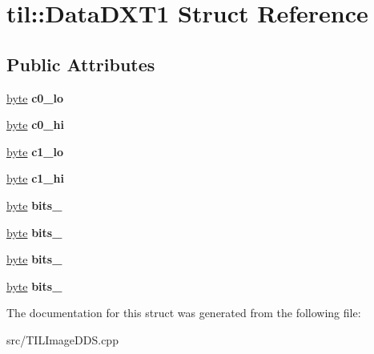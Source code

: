 \hypertarget{structtil_1_1_data_d_x_t1}{
\section{til::DataDXT1 Struct Reference}
\label{structtil_1_1_data_d_x_t1}
}
\subsection*{Public Attributes}
\begin{DoxyCompactItemize}
\item 
\hypertarget{structtil_1_1_data_d_x_t1_a2ffc72e66293f9b049a7bb83b9b325bd}{
\hyperlink{namespacetil_a5f3ec10aca1a788b495a0bd3787bc2dc}{byte} {\bfseries c0\_\-lo}}
\label{structtil_1_1_data_d_x_t1_a2ffc72e66293f9b049a7bb83b9b325bd}

\item 
\hypertarget{structtil_1_1_data_d_x_t1_a32e9d420a013bd7413807927ed8cb58c}{
\hyperlink{namespacetil_a5f3ec10aca1a788b495a0bd3787bc2dc}{byte} {\bfseries c0\_\-hi}}
\label{structtil_1_1_data_d_x_t1_a32e9d420a013bd7413807927ed8cb58c}

\item 
\hypertarget{structtil_1_1_data_d_x_t1_a806e62158bdc394fbdd1fd1d584ddae5}{
\hyperlink{namespacetil_a5f3ec10aca1a788b495a0bd3787bc2dc}{byte} {\bfseries c1\_\-lo}}
\label{structtil_1_1_data_d_x_t1_a806e62158bdc394fbdd1fd1d584ddae5}

\item 
\hypertarget{structtil_1_1_data_d_x_t1_ad9c523434092c5455f190930e433e1ed}{
\hyperlink{namespacetil_a5f3ec10aca1a788b495a0bd3787bc2dc}{byte} {\bfseries c1\_\-hi}}
\label{structtil_1_1_data_d_x_t1_ad9c523434092c5455f190930e433e1ed}

\item 
\hypertarget{structtil_1_1_data_d_x_t1_a1ca0790ed57b3e2e1f666d0b102952fc}{
\hyperlink{namespacetil_a5f3ec10aca1a788b495a0bd3787bc2dc}{byte} {\bfseries bits\_}}
\label{structtil_1_1_data_d_x_t1_a1ca0790ed57b3e2e1f666d0b102952fc}

\item 
\hypertarget{structtil_1_1_data_d_x_t1_a6647901e545f59530a20f2722442a7bc}{
\hyperlink{namespacetil_a5f3ec10aca1a788b495a0bd3787bc2dc}{byte} {\bfseries bits\_}}
\label{structtil_1_1_data_d_x_t1_a6647901e545f59530a20f2722442a7bc}

\item 
\hypertarget{structtil_1_1_data_d_x_t1_a22536cd2dbbd32ac40753cb2fb31031f}{
\hyperlink{namespacetil_a5f3ec10aca1a788b495a0bd3787bc2dc}{byte} {\bfseries bits\_}}
\label{structtil_1_1_data_d_x_t1_a22536cd2dbbd32ac40753cb2fb31031f}

\item 
\hypertarget{structtil_1_1_data_d_x_t1_a5e3608c0fd43979d293d431ec302e0f2}{
\hyperlink{namespacetil_a5f3ec10aca1a788b495a0bd3787bc2dc}{byte} {\bfseries bits\_}}
\label{structtil_1_1_data_d_x_t1_a5e3608c0fd43979d293d431ec302e0f2}

\end{DoxyCompactItemize}


The documentation for this struct was generated from the following file:\begin{DoxyCompactItemize}
\item 
src/TILImageDDS.cpp\end{DoxyCompactItemize}
